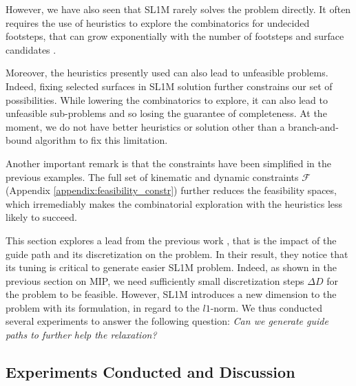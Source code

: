 However, we have also seen that SL1M rarely solves the problem directly. 
It often requires the use of heuristics to explore the combinatorics for undecided footsteps, that can grow exponentially with the number of footsteps and surface candidates \cite{sl1m_v1}.

Moreover, the heuristics presently used can also lead to unfeasible problems. 
Indeed, fixing selected surfaces in SL1M solution further constrains our set of possibilities. While lowering the combinatorics to explore, it can also lead to unfeasible sub-problems and so losing the guarantee of completeness.
At the moment, we do not have better heuristics or solution other than a branch-and-bound algorithm to fix this limitation.

Another important remark is that the constraints have been simplified in the previous examples.
The full set of kinematic and dynamic constraints $\mathcal{F}$ (Appendix \ref{appendix:feasibility_constr}) further reduces the feasibility spaces, which irremediably makes the combinatorial exploration with the heuristics less likely to succeed.

This section explores a lead from the previous work \cite{sl1m_v2}, that is the impact of the guide path and its discretization on the problem.
In their result, they notice that its tuning is critical to generate easier SL1M problem.
Indeed, as shown in the previous section on MIP, we need sufficiently small discretization steps $\Delta D$ for the problem to be feasible. 
However, SL1M introduces a new dimension to the problem with its formulation, in regard to the $l1$-norm.
We thus conducted several experiments to answer the following question: \textit{Can we generate guide paths to further help the relaxation?}


\subsection{Experiments Conducted and Discussion}

